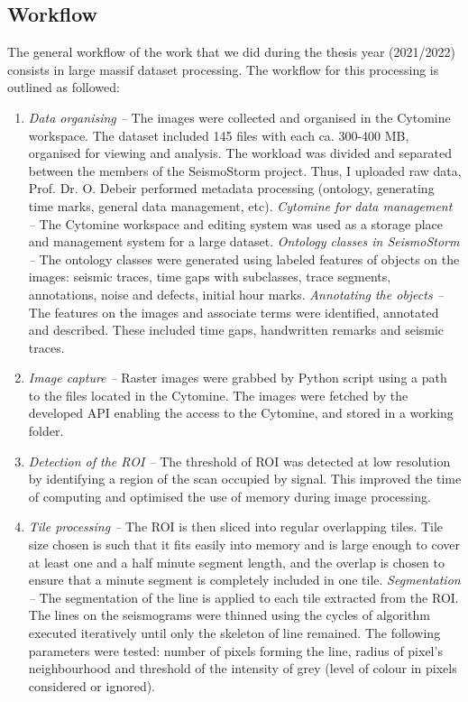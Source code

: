 \documentclass[a4paper,english,12pt]{article}
\begin{document}
\subsection{Workflow}
The general workflow of the work that we did during the  thesis year (2021/2022) consists in large massif dataset processing. The workflow for this processing is outlined as followed: 
 
\begin{enumerate}
	\item \emph{Data organising --} The images were collected and organised in the Cytomine workspace. The dataset included 145 files with each ca. 300-400 MB, organised for viewing and analysis. The workload was divided and separated between the members of the SeismoStorm project. Thus, I uploaded raw data, Prof. Dr. O. Debeir performed metadata processing (ontology, generating time marks, general data management, etc). 	
	\subitem \emph{Cytomine for data management -- } The Cytomine workspace and editing system was used as a storage place and management system for a large dataset.
	\subitem \emph{Ontology classes in SeismoStorm -- } The ontology classes were generated using labeled features of objects on the images: seismic traces, time gaps with subclasses, trace segments, annotations, noise and defects, initial hour marks.
	\subitem \emph{Annotating the objects -- } The features on the images and associate terms were identified, annotated and described. These included time gaps, handwritten remarks and seismic traces.	
	\item \emph{Image capture -- } Raster images were grabbed by Python script using a path to the files located in the Cytomine. The images were fetched by the developed API enabling the access to the Cytomine, and stored in a working folder.	
	\item \emph{Detection of the ROI -- } The threshold of ROI was detected at low resolution by identifying a region of the scan occupied by signal. This improved the time of computing and optimised the use of memory during image processing.  	
	\item \emph{Tile processing -- } The ROI is then sliced into regular overlapping tiles. Tile size chosen is such that it fits easily into memory and is large enough to cover at least one and a half minute segment length, and the overlap is chosen to ensure that a minute segment is completely included in one tile. 	
	\subitem \emph{Segmentation -- } The segmentation of the line is applied to each tile extracted from the ROI. The lines on the seismograms were thinned using the cycles of algorithm executed iteratively until only the skeleton of line remained. The following parameters were tested: number of pixels forming the line, radius of pixel's neighbourhood and threshold of the intensity of grey (level of colour in pixels considered or ignored).	

\end{enumerate}
\end{document}
